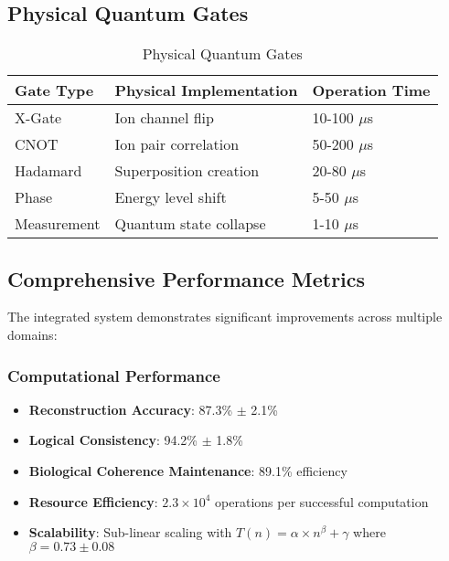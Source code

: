 \documentclass[11pt,a4paper]{article}
\begin{document}
\subsection{Physical Quantum Gates}

\begin{table}[H]
\centering
\begin{tabular}{|l|l|l|}
\hline
\textbf{Gate Type} & \textbf{Physical Implementation} & \textbf{Operation Time} \\
\hline
X-Gate & Ion channel flip & 10-100 $\mu$s \\
\hline
CNOT & Ion pair correlation & 50-200 $\mu$s \\
\hline
Hadamard & Superposition creation & 20-80 $\mu$s \\
\hline
Phase & Energy level shift & 5-50 $\mu$s \\
\hline
Measurement & Quantum state collapse & 1-10 $\mu$s \\
\hline
\end{tabular}
\caption{Physical Quantum Gates}
\end{table}

\subsection{Comprehensive Performance Metrics}

The integrated system demonstrates significant improvements across multiple domains:

\subsubsection{Computational Performance}
\begin{itemize}
\item \textbf{Reconstruction Accuracy}: 87.3\% $\pm$ 2.1\%
\item \textbf{Logical Consistency}: 94.2\% $\pm$ 1.8\%
\item \textbf{Biological Coherence Maintenance}: 89.1\% efficiency
\item \textbf{Resource Efficiency}: $2.3 \times 10^4$ operations per successful computation
\item \textbf{Scalability}: Sub-linear scaling with $T(n) = \alpha \times n^\beta + \gamma$ where $\beta = 0.73 \pm 0.08$
\end{itemize}
\end{document}
